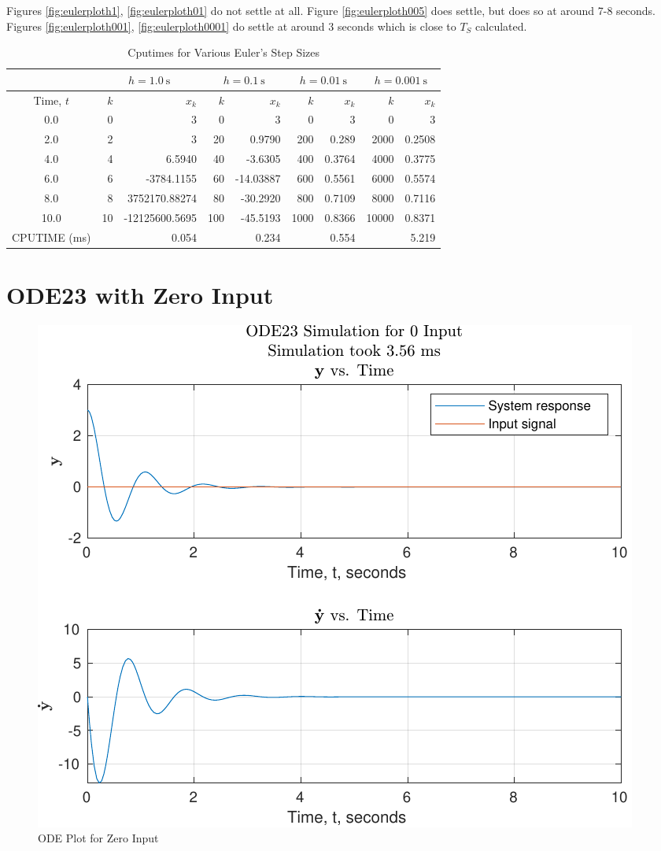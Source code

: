 \documentclass[12pt]{article}
\begin{document}
		Figures \ref{fig:eulerploth1}, \ref{fig:eulerploth01} do not settle at all. Figure \ref{fig:eulerploth005} does settle, but does so at around 7-8 seconds. Figures \ref{fig:eulerploth001}, \ref{fig:eulerploth0001} do settle at around 3 seconds which is close to $T_{S}$ calculated. 
		\begin{table}[H]
			\centering
			\caption{Cputimes for Various Euler's Step Sizes}
			\begin{tabular}{|c|r|r|r|r|r|r|r|r|}
				\hline & \multicolumn{2}{|c|}{$h=1.0 \mathrm{~s}$} & \multicolumn{2}{c|}{$h=0.1 \mathrm{~s}$} & \multicolumn{2}{c|}{$h=0.01 \mathrm{~s}$} & \multicolumn{2}{|c|}{$h=0.001 \mathrm{~s}$} \\
				\hline Time, $t$ & $k$ & $x_k$ & $k$ & $x_k$ & $k$ & $x_k$ & $k$ & $x_k$ \\
				\hline 0.0 & 0 & 3 & 0 & 3 & 0 & 3 & 0 & 3 \\
				2.0 & 2 & 3 & 20 & 0.9790 & 200 & 0.289 & 2000 & 0.2508 \\
				4.0 & 4 & 6.5940 & 40 & -3.6305 & 400 & 0.3764 & 4000 & 0.3775 \\
				6.0 & 6 & -3784.1155 & 60 & -14.03887 & 600 & 0.5561 & 6000 & 0.5574 \\
				8.0 & 8 & 3752170.88274 & 80 & -30.2920 & 800 & 0.7109 & 8000 & 0.7116\\
				10.0 & 10 & -12125600.5695 & 100 & -45.5193 & 1000 & 0.8366 & 10000 & 0.8371 \\
				\hline CPUTIME (ms) & & 0.054 & & 0.234 & & 0.554 & & 5.219 \\
				\hline
			\end{tabular}
		\end{table}
	\section{ODE23 with Zero Input}
	
		\begin{figure}[H]
			\centering
			\includegraphics[width=1\linewidth]{Code/Fig/ode_no_input}
			\caption{ODE Plot for Zero Input}
			\label{fig:odenoinput}
		\end{figure}
		
\end{document}

